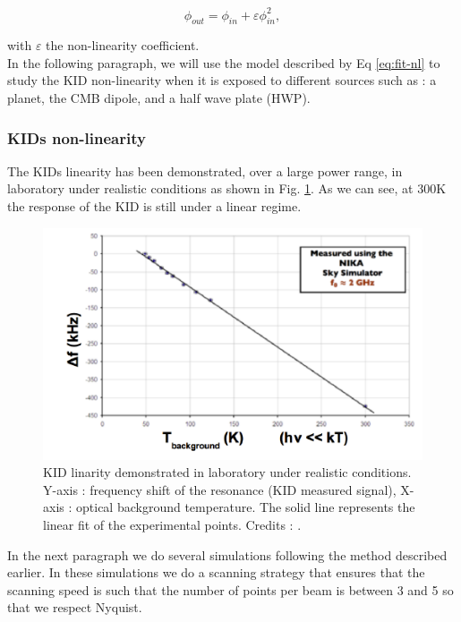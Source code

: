 \begin{equation}
\phi_{out} = \phi_{in} + \varepsilon \phi_{in}^{2},
\label{eq:fit-nl}
\end{equation}

with $\varepsilon$ the non-linearity coefficient. \\
In the following paragraph, we will use the model described by Eq \ref{eq:fit-nl} to study the KID non-linearity when it is exposed to different sources such as : a planet, the CMB dipole, and a half wave plate (HWP).

\subsubsection{KIDs non-linearity}

The KIDs linearity has been demonstrated, over a large power range, in laboratory under realistic conditions as shown in Fig. \ref{KID-lin}. As we can see, at 300K the response of the KID is still under a linear regime.

\begin{figure}[h]
\center
	\includegraphics[scale=0.55]{Figures/KID-linearity-Monfardini2014.png}
	\caption{KID linarity demonstrated in laboratory under realistic conditions. Y-axis : frequency shift of the resonance (KID measured signal), X-axis : optical background temperature. The solid line represents the linear fit of the experimental points. Credits : \citet{2014JLTP..176..787M}.}
	\label{KID-lin}
\end{figure}

In the next paragraph we do several simulations following the method described earlier. In these simulations we do a scanning strategy that ensures that the scanning speed is such that the number of points per beam is between 3 and 5 so that we respect Nyquist.

